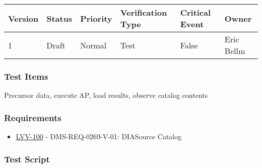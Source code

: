 \begin{longtable}[]{@{}llllll@{}}
\toprule
Version & Status & Priority & Verification Type & Critical Event &
Owner\tabularnewline
\midrule
\endhead
1 & Draft & Normal & Test & False & Eric Bellm\tabularnewline
\bottomrule
\end{longtable}

\hypertarget{test-items-25}{%
\subsubsection{Test Items}\label{test-items-25}}

Precursor data, execute AP, load results, observe catalog contents

\hypertarget{requirements-26}{%
\subsubsection{Requirements}\label{requirements-26}}

\begin{itemize}
\tightlist
\item
  \href{https://jira.lsstcorp.org/browse/LVV-100}{LVV-100} -
  DMS-REQ-0269-V-01: DIASource Catalog
\end{itemize}

\hypertarget{test-script-26}{%
\subsubsection{Test Script}\label{test-script-26}}

